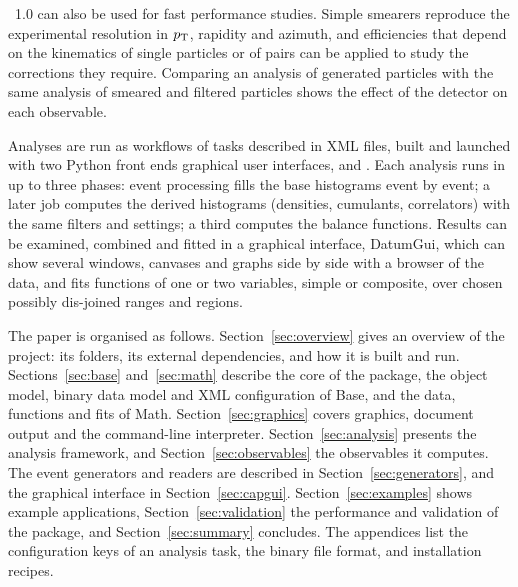 \Datum{}~1.0 can also be used for fast performance studies. Simple smearers reproduce the experimental resolution in
$p_{\mathrm{T}}$, rapidity and azimuth, and efficiencies that depend on the kinematics of single particles or of pairs can be
applied to study the corrections they require. Comparing an analysis of generated particles with the same analysis
of smeared and filtered particles shows the effect of the detector on each observable.

Analyses are run as workflows of tasks described in XML files, built and launched with two Python front ends graphical user interfaces,
 and . Each analysis runs in up to three phases: event processing fills the base
histograms event by event; a later job computes the derived histograms (densities, cumulants, correlators) with the same filters
and settings; a third computes the balance functions. Results can be examined, combined and fitted in a graphical
interface, DatumGui, which can show several windows, canvases and graphs side by side with a browser of the data, and
fits functions of one or two variables, simple or composite, over chosen possibly dis-joined ranges and regions.

The paper is organised as follows. Section~\ref{sec:overview} gives an overview of the project: its folders, its
external dependencies, and how it is built and run. Sections~\ref{sec:base} and~\ref{sec:math} describe the core
of the package, the object model, binary data model and XML configuration of Base, and the data, functions and fits
of Math. Section~\ref{sec:graphics} covers graphics, document output and the command-line interpreter.
Section~\ref{sec:analysis} presents the analysis framework, and Section~\ref{sec:observables} the observables it
computes. The event generators and readers are described in Section~\ref{sec:generators}, and the graphical
interface in Section~\ref{sec:capgui}. Section~\ref{sec:examples} shows example applications,
Section~\ref{sec:validation} the performance and validation of the package, and Section~\ref{sec:summary} concludes.
The appendices list the configuration keys of an analysis task, the binary file format, and installation recipes.

